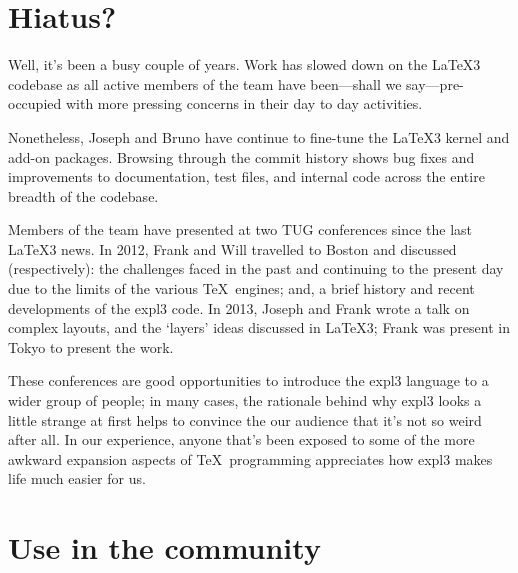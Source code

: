 \documentclass{ltnews}
\begin{document}
\maketitle

\raisefirstsection
\section{Hiatus?}

Well, it's been a busy couple of years.
Work has slowed down on the LaTeX3 codebase as all active members of the team have been---shall we say---pre-occupied with more pressing concerns in their day to day activities.

Nonetheless, Joseph and Bruno have continue to fine-tune the LaTeX3 kernel and add-on packages.
Browsing through the commit history shows bug fixes and improvements to documentation, test files, and internal code across the entire breadth of the codebase.

Members of the team have presented at two TUG conferences since the last LaTeX3 news.
In 2012, Frank and Will travelled to Boston and discussed (respectively): the challenges faced in the past and continuing to the present day due to the limits of the various \TeX\ engines; and, a brief history and recent developments of the expl3 code.
In 2013, Joseph and Frank wrote a talk on complex layouts, and the `layers' ideas discussed in LaTeX3; Frank was present in Tokyo to present the work.

These conferences are good opportunities to introduce the expl3 language to a wider group of people; in many cases, the rationale behind why expl3 looks a little strange at first helps to convince the our audience that it's not so weird after all.
In our experience, anyone that's been exposed to some of the more awkward expansion aspects of \TeX\ programming appreciates how expl3 makes life much easier for us.

\section{Use in the community}
\end{document}
